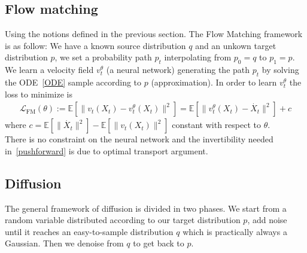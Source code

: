 \documentclass{article}
\begin{document}
\begin{comment}
\subsection{Continuous normalizing flow}

In continuous normalizing flow framework, \(f\) is obtained using a continuous dynamic 
\begin{align}
    \frac{\partial x_0}{\partial t} = f(x_t,t)
\end{align}
In continuous normalizing flows, \(f\) is obtzined by solving the neural ODE 
\begin{align}
    x_T = x_0+\int_0^T f(x_t,t)^{\theta} dt
\end{align}

CNF are trained by maximizing the log-likelyhood 
\begin{align}
    \mathcal{L}(\theta) = \mathbb{E}[\log p(x)]
\end{align}
\end{comment}

\subsection{Flow matching}

Using the notions defined in the previous section. The Flow Matching framework is as follow: 
We have a known source distribution \(q\) and an unkown target distribution \(p\), we set a probability path \(p_t\) interpolating from \(p_0=q\) to \(p_1=p\). We learn a velocity field \(v_t^\theta\) (a neural network) generating the path \(p_t\) by solving the ODE~\ref{ODE} sample according to \(p\) (approximation). In order to learn \(v_t^\theta\) the loss to minimize is 
\begin{align}
    \mathcal{L}_\text{FM}(\theta):=\mathbb{E}[\|v_t(X_t)-v_t^\theta(X_t)\|^2]= \mathbb{E}[\|v_t^\theta(X_t)-\dot{X_t}\|^2] + c
\end{align} 
where \(c = \mathbb{E}[\|\dot{X_t}\|^2]-\mathbb{E}[\|v_t(X_t)\|^2]\) constant with respect to \(\theta\). \\
There is no constraint on the neural network and the invertibility needed in~\ref{pushforward} is due to optimal transport argument.

\subsection{Diffusion}
The general framework of diffusion is divided in two phases. We start from a random variable distributed according to our target distribution \( p \), add noise until it reaches an easy-to-sample distribution \(q\) which is practically always a Gaussian. Then we denoise from \(q\) to get back to \(p\). 
\end{document}
